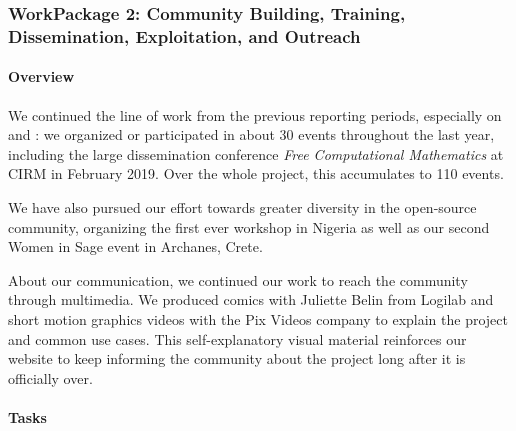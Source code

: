 \subsubsection{WorkPackage 2:  Community Building, Training, Dissemination, Exploitation, and Outreach}
\label{dissem}

\paragraph{Overview}

We continued the line of work from the previous reporting periods,
especially on 
and : we organized or
participated in about 30 events throughout the last year, including
the large dissemination conference \emph{Free Computational
  Mathematics} at CIRM in February 2019. Over the whole project, this
accumulates to 110 events.

We have also pursued our effort towards greater diversity in the
open-source community, organizing the first ever \Sage workshop in
Nigeria as well as our second Women in Sage event in Archanes, Crete.

About our communication, we continued our work to reach the community
through multimedia. We produced comics with Juliette Belin from
Logilab and short motion graphics videos with the Pix Videos company
to explain the project and common use cases. This self-explanatory
visual material reinforces our website to keep informing the community
about the project long after it is officially over.

\paragraph{Tasks}

\subparagraph{}
\label{dissem@dissemination-communication}

